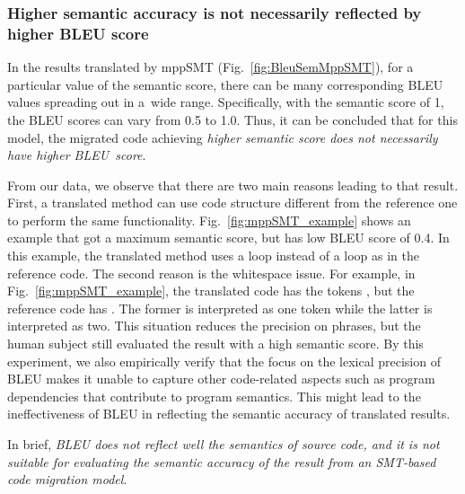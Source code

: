 
\subsubsection{{\bf Higher semantic accuracy is not necessarily reflected by
higher BLEU score}} In the results translated by mppSMT
(Fig.~\ref{fig:BleuSemMppSMT}), for a particular value of the semantic
score, there can be many corresponding BLEU values spreading out in
a~wide range. Specifically, with the semantic score of 1, the BLEU
scores can vary from 0.5 to 1.0. Thus, it can be concluded
that for this model, the migrated code achieving {\em higher semantic score does not necessarily have higher BLEU~score}.

From our data, we observe that there are two main reasons leading to
that result.
%
First, a translated method can use code structure different from the
reference one to perform the same
functionality. Fig.~\ref{fig:mppSMT_example} shows an example that got
a maximum semantic score, but has low BLEU score of 0.4. In this
example, the translated method uses a  loop instead of a
 loop as in the reference code. The second reason is the
whitespace issue. For example, in Fig.~\ref{fig:mppSMT_example}, the
translated code has the tokens , but the reference
code has . The former is interpreted as one token
while the latter is interpreted as two. This situation reduces
the precision on phrases, but the human subject still evaluated the
result with a high semantic score. By this experiment, we also
empirically verify that the focus on the lexical precision of BLEU
makes it unable to capture other code-related aspects such as program
dependencies that contribute to program semantics. This might lead
to the ineffectiveness of BLEU in reflecting the semantic accuracy of
translated results.

In brief, {\em BLEU does not reflect well the
semantics of source code, and it is not suitable for evaluating the 
semantic accuracy of the result from an SMT-based code migration model}.

